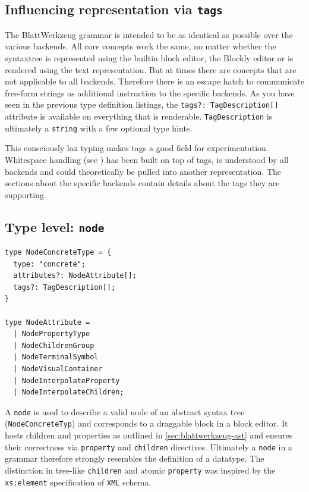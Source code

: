 \documentclass[]{report}
\begin{document}
\subsection{Influencing representation via \texttt{tags}}

The Blatt\-Werkzeug grammar is intended to be as identical as possible over the various backends. All core concepts work the same, no matter whether the syntaxtree is represented using the builtin block editor, the Blockly editor or is rendered using the text representation. But at times there are concepts that are not applicable to all backends. Therefore there is an escape hatch to communicate free-form strings as additional instruction to the specific backends. As you have seen in the previous type definition listings, the \texttt{tags?: TagDescription[]} attribute is available on everything that is renderable. \texttt{TagDescription} is ultimately a \texttt{string} with a few optional type hints.

This consciously lax typing makes tags a good field for experimentation. Whitespace handling (see ) has been built on top of tags, is understood by all backends and could theoretically be pulled into another representation. The sections about the specific backends contain details about the tags they are supporting.


\subsection{Type level: \texttt{node}}
\label{sec:grammar-type-node}

\begin{listing}[H]
\begin{verbatim}
type NodeConcreteType = {
  type: "concrete";
  attributes?: NodeAttribute[];
  tags?: TagDescription[];
}

type NodeAttribute =
  | NodePropertyType
  | NodeChildrenGroup
  | NodeTerminalSymbol
  | NodeVisualContainer
  | NodeInterpolateProperty
  | NodeInterpolateChildren;

\end{verbatim}
\caption{Type definition of \texttt{node} specification}
\label{lst:grammar-container-description}
\end{listing}

A \texttt{node} is used to describe a valid node of an abstract syntax tree (\texttt{NodeConcreteTyp}) and corresponds to a draggable block in a block editor. It hosts children and properties as outlined in \ref{sec:blattwerkzeug-ast} and ensures their correctness via \texttt{property} and \texttt{children} directives. Ultimately a \texttt{node} in a grammar therefore strongly resembles the definition of a datatype. The distinction in tree-like \texttt{children} and atomic \texttt{property} was inspired by the \texttt{xs:element} specification of \texttt{XML} schema\cite[§3.3 - Element declarations]{W3CXMLSchema}.
\end{document}
